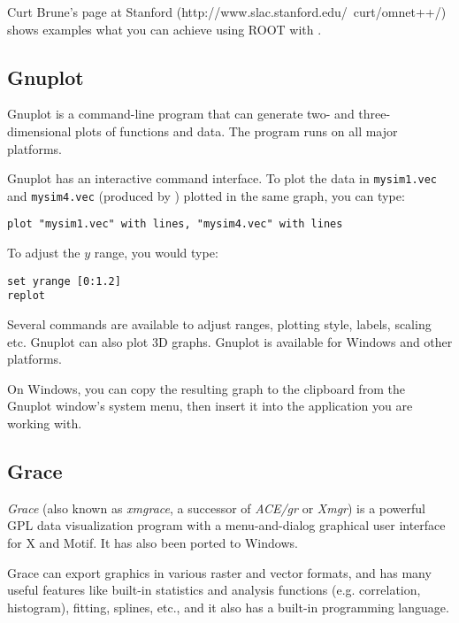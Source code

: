 Curt Brune's page at Stanford (http://www.slac.stanford.edu/~curt/omnet++/)
shows examples what you can achieve using ROOT with {\opp}.


\subsection{Gnuplot}

Gnuplot is a command-line program that can generate two- and three-dimensional
plots of functions and data. The program runs on all major platforms.

Gnuplot has an interactive command interface. To plot the data in
\texttt{mysim1.vec} and \texttt{mysim4.vec} (produced by )
plotted in the same graph, you can type:

\begin{verbatim}
plot "mysim1.vec" with lines, "mysim4.vec" with lines
\end{verbatim}

To adjust the $y$ range, you would type:

\begin{verbatim}
set yrange [0:1.2]
replot
\end{verbatim}

Several commands are available to adjust ranges, plotting style, labels,
scaling etc. Gnuplot can also plot 3D graphs. Gnuplot
is available for Windows and other platforms.

On Windows, you can copy the resulting graph to the clipboard from
the Gnuplot window's system menu, then insert it into the application you
are working with.


\subsection{Grace}

\textit{Grace} (also known as \textit{xmgrace}, a successor of
\textit{ACE/gr} or \textit{Xmgr}) is a powerful GPL data visualization
program with a menu-and-dialog graphical user interface for X and Motif. It
has also been ported to Windows.

Grace can export graphics in various raster and vector formats, and has
many useful features like built-in statistics and analysis functions (e.g.
correlation, histogram), fitting, splines, etc., and it also has a built-in
programming language.




